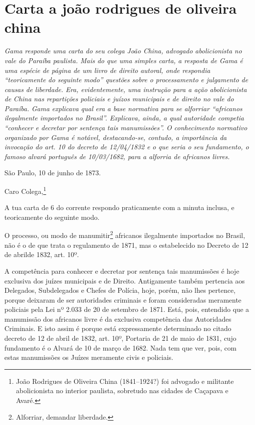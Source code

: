 \chapter{Carta a joão rodrigues de oliveira china}%

\begin{didascalia}
\emph{Gama responde uma carta do seu colega João China, advogado
abolicionista no vale do Paraíba paulista. Mais do que uma simples
carta, a resposta de Gama é uma espécie de página de um livro de direito
autoral, onde respondia ``teoricamente do seguinte modo'' questões sobre o
processamento e julgamento de causas de liberdade. Era, evidentemente,
uma instrução para a ação abolicionista de China nas repartições
policiais e juízos municipais e de direito no vale do Paraíba. Gama
explicava qual era a base normativa para se alforriar ``africanos
ilegalmente importados no Brasil''. Explicava, ainda, a qual autoridade
competia ``conhecer e decretar por sentença tais manumissões''. O
conhecimento normativo organizado por Gama é notável, destacando-se,
contudo, a importância da invocação do art. 10 do decreto de 12/04/1832
e o que seria o seu fundamento, o famoso alvará português de 10/03/1682,
para a alforria de africanos livres.}
\end{didascalia}


São Paulo, 10 de junho de 1873.

Caro Colega,\footnote{ João Rodrigues de Oliveira China (1841--1924?)
  foi advogado e militante abolicionista no interior paulista, sobretudo
  nas cidades de Caçapava e Avaré.}

A tua carta de 6 do corrente respondo praticamente com a minuta inclusa,
e teoricamente do seguinte modo.

O processo, ou modo de manumitir\footnote{ Alforriar, demandar
  liberdade.} africanos ilegalmente importados no Brasil, não é o de que
trata o regulamento de 1871, mas o estabelecido no Decreto de 12 de
abrilde 1832, art. 10º.

A competência para conhecer e decretar por sentença tais manumissões é
hoje exclusiva dos juízes municipais e de Direito. Antigamente também
pertencia aos Delegados, Subdelegados e Chefes de Polícia, hoje, porém,
não lhes pertence, porque deixaram de ser autoridades criminais e foram
consideradas meramente policiais pela Lei nº 2.033 de 20 de setembro de
1871. Está, pois, entendido que a manumissão dos africanos livre é da
exclusiva competência das {Autoridades Criminais}. E isto assim é porque
está expressamente determinado no citado decreto de 12 de abril de 1832,
art. 10º, Portaria de 21 de maio de 1831, cujo fundamento é o Alvará de
10 de março de 1682. Nada tem que ver, pois, com estas manumissões os
Juízes meramente civis e policiais.

